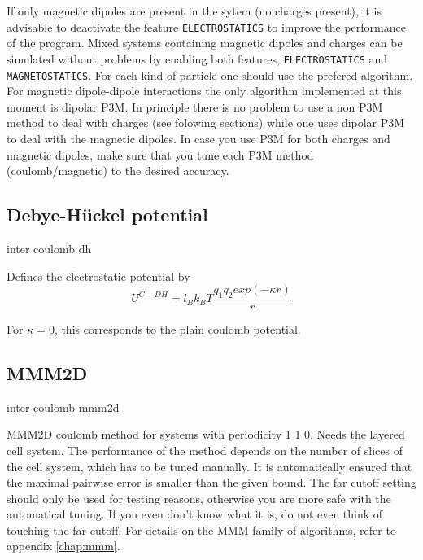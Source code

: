 If only magnetic dipoles are present in the sytem (no charges
present), it is advisable to deactivate the feature
\texttt{ELECTROSTATICS} to improve the performance of the program.
Mixed systems containing magnetic dipoles and charges can be simulated
without problems by enabling both features, \texttt{ELECTROSTATICS}
and \texttt{MAGNETOSTATICS}. For each kind of particle one should use
the prefered algorithm. For magnetic dipole-dipole interactions the
only algorithm implemented at this moment is dipolar P3M. In principle
there is no problem to use a non P3M method to deal with charges (see
folowing sections) while one uses dipolar P3M to deal with the
magnetic dipoles. In case you use P3M for both charges and magnetic
dipoles, make sure that you tune each P3M method (coulomb/magnetic) to
the desired accuracy.

\subsection{Debye-H\"uckel potential}

\begin{essyntax}
  inter coulomb  dh \var{\kappa} 
  \begin{features}
  \end{features}
\end{essyntax}

Defines the electrostatic potential by
\begin{equation}
  U^{C-DH} = l_B k_B T \frac{q_1 q_2 exp(-\kappa r)}{r}
\end{equation}

For $\kappa = 0$, this corresponds to the plain coulomb potential.

\subsection{MMM2D}

\begin{essyntax}
 inter coulomb  mmm2d 
  \begin{features}
  \end{features}
\end{essyntax}
MMM2D coulomb method for systems with periodicity 1 1 0. Needs the
layered cell system. The performance of the method depends on the
number of slices of the cell system, which has to be tuned manually.
It is automatically ensured that the maximal pairwise error is smaller
than the given bound. The far cutoff setting should only be used for
testing reasons, otherwise you are more safe with the automatical
tuning. If you even don't know what it is, do not even think of
touching the far cutoff. For details on the MMM family of algorithms,
refer to appendix \vref{chap:mmm}.

